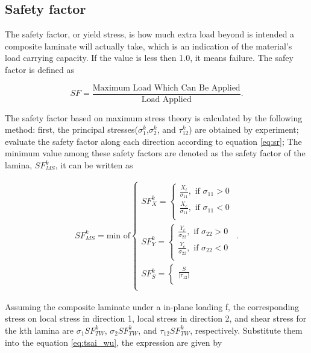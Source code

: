 \subsection{Safety factor}
The safety factor, or yield stress, is how much extra load beyond is intended a
composite laminate will actually take, which is an indication of the material's
load carrying capacity. If the value is less then 1.0, it means failure. The safey factor is defined as 

\begin{equation} \label{eq:sr}SF=\frac{\text {Maximum Load Which Can Be
	Applied}}{\text {Load Applied}} {\textstyle .}
\end{equation}

The safety factor based on maximum stress theory is calculated by the following
method: first, the principal stresses($\sigma_1^k$,$\sigma_2^k$, and
$\tau_{12}^k$) are obtained by experiment; evaluate the safety factor along each
direction according to equation \ref{eq:sr}; The minimum value among these
safety factors are denoted as the safety factor of the lamina, $SF_{MS}^k$, it
can be written as 

\begin{align}
	SF_{MS}^k = \text{min of}
	\begin{cases}
		SF_X^k = 
		\begin{cases}
			\frac{X_t}{\sigma_{11}}, \text{ if } \sigma_{11}>0 \\
			\frac{X_c}{\sigma_{11}}, \text{ if } \sigma_{11}<0 \\
		\end{cases} \\
		SF_Y^k = 
		\begin{cases}
			\frac{Y_t}{\sigma_{22}}, \text{ if } \sigma_{22}>0 \\
			\frac{Y_c}{\sigma_{22}}, \text{ if } \sigma_{22}<0 \\
		\end{cases} \\
		SF_S^k =
		\begin{cases}
			\frac{S}{|\tau_{12}|} \\
		\end{cases} \\
	\end{cases} \textstyle{.}
\end{align}


Assuming the composite laminate under a in-plane loading f, the corresponding
stress on local stress in direction 1, local stress in direction 2, and shear
stress for the kth lamina are $\sigma_1 SF_{TW}^k$, $\sigma_2SF_{TW}^k$, and $\tau_{12}SF_{TW}^k$,
respectively. Substitute them into the equation \ref{eq:tsai_wu}, the expression
are given by

